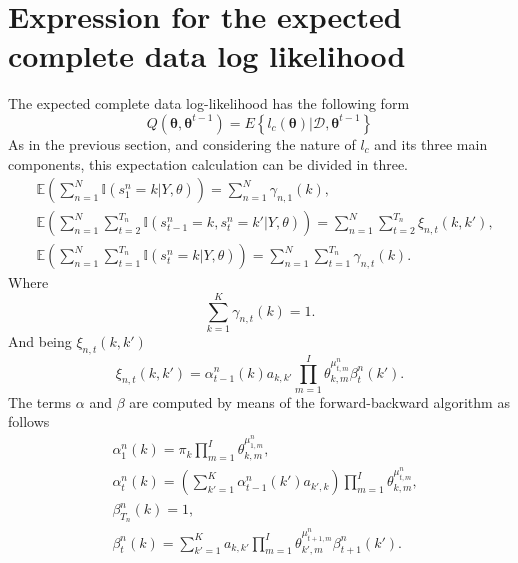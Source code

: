 \documentclass[12pt]{article}%
\newcommand{\indicator}{\mathbb{I}}
\newcommand{\expectation}{\mathbb{E}}
\begin{document}
\section{Expression for the expected complete data log likelihood}
The expected complete data log-likelihood has the following form
\begin{equation}
Q \left( \boldsymbol { \theta } , \boldsymbol { \theta } ^ { t - 1 } \right) = E \left\{ l _ { c } ( \boldsymbol { \theta } ) | \mathcal { D } , \boldsymbol { \theta } ^ { t - 1 } \right\}
\end{equation}
As in the previous section, and considering the nature of $l_{c}$ and its three main components, this expectation calculation can be divided in three.
\begin{align}
& \expectation \left( \sum _ { n = 1 } ^ { N } \indicator \left( s _ { 1 } ^ { n } = k | Y , \theta \right) \right) = \sum _ { n = 1 } ^ { N } \gamma _ { n , 1 } ( k ), \\
& \expectation \left( \sum _ { n = 1 } ^ { N } \sum _ { t = 2 } ^ { T _ { n } } \indicator \left( s _ { t - 1 } ^ { n } = k , s _ { t } ^ { n } = k' | Y , \theta \right) \right) = \sum _ { n = 1 } ^ { N } \sum _ { t = 2 } ^ { T _ { n } } \xi _ { n , t } ( k , k' ), \\
& \expectation \left( \sum _ { n = 1 } ^ { N } \sum _ { t = 1 } ^ { T _ { n } } \indicator \left( s _ { t } ^ { n } = k | Y , \theta \right) \right) = \sum _ { n = 1 } ^ { N } \sum _ { t = 1 } ^ { T _ { n } } \gamma _ { n , t } ( k ).
\end{align}
Where 
\begin{equation}
\sum _ { k = 1 } ^ { K } \gamma _ { n , t } ( k ) = 1.
\end{equation}
\noindent And being $\xi _ { n,t } ( k , k' )$ 
\begin{equation}
\xi _ { n,t } ( k , k' ) = \alpha _ { t -1}^{n} ( k ) a _ { k,k' } \prod\limits_{m=1}^{I} \theta_{k,m}^{\mu^{n}_{t,m}} \beta _ { t  }^{n} ( k' ).
\end{equation}
The terms $\alpha$ and $\beta$ are computed by means of the forward-backward algorithm as follows
\begin{align}
&\alpha _ { 1 }^{n} ( k ) = \pi _ { k } \prod\limits_{m=1}^{I}\theta_{k,m}^{\mu^{n}_{1,m}}, \\
&\alpha _ { t }^{n} ( k ) = \left( \sum _ { k' = 1 } ^ { K } \alpha _ { t - 1 }^{n} ( k' ) a _ { k',k } \right) \prod\limits_{m=1}^{I}\theta_{k,m}^{\mu^{n}_{t,m}}, \\
&\beta _ { T_{n} }^{n} ( k ) = 1, \\
& \beta _ { t }^{n} ( k ) = \sum _ {k' = 1 } ^ { K } a _ { k,k'}  \prod\limits_{m=1}^{I}\theta_{k',m}^{\mu^{n}_{t+1,m}}  \beta _ { t + 1 }^{n} ( k' ).
\end{align}
\end{document}
